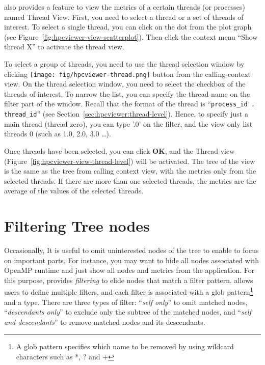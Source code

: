 \hpcviewer{} also provides a feature to view the metrics of a certain threads (or processes) named Thread View.
First, you need to select a thread or a set of threads of interest.
To select a single thread, you can click on the dot from the plot graph (see Figure~\ref{fig:hpcviewer-view-scatterplot}).
Then click the context menu ``Show thread X'' to activate the thread view.

To select a group of threads, you need to use the thread selection window by clicking \texttt{[image: fig/hpcviewer-thread.png]} button from the calling-context view.
On the thread selection window, you need to select the checkbox of the threads of interest. 
To  narrow the list, you can specify the thread name on the filter part of the window.
Recall that the format of the thread is ``\texttt{process\_id . thread\_id}'' (see Section~\ref{sec:hpcviewer:thread-level}).
Hence, to specify just a main thread (thread zero), you can type '.0' on the filter, and the view only list threads 0 (such as 1.0, 2.0, 3.0 \dots).

Once threads have been selected, you can click \textbf{OK}, and the Thread view (Figure~\ref{fig:hpcviewer-view-thread-level}) will be activated. 
The tree of the view is the same as the tree from calling context view, with the metrics only from the selected threads.
If there are more than one selected threads, the metrics are the average of the values of the selected threads.


\section{Filtering Tree nodes}
\label{sec:filter}
Occasionally, It is useful to omit uninterested nodes of the tree to enable to focus on important parts. 
For instance, you may want to hide all nodes associated with OpenMP runtime and just show all nodes and metrics from the application. 
For this purpose, \hpcviewer{} provides \emph{filtering} to elide nodes that match a filter pattern.
\hpcviewer{} allows  users to define multiple filters, and each filter is associated with a glob pattern\footnote{A glob pattern specifies which name to be removed by using wildcard characters such as *, ? and +} and a type.
There are three types of filter: ``\emph{self only}'' to omit matched nodes, 
``\emph{descendants only}'' to exclude only the subtree of the matched nodes, and ``\emph{self and descendants}'' to
remove matched nodes and its descendants.

